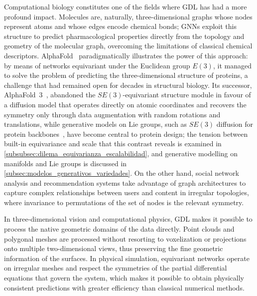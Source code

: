 Computational biology constitutes one of the fields where \gls{GDL} has had a more profound impact. Molecules are, naturally, three-dimensional graphs whose nodes represent atoms and whose edges encode chemical bonds; \glspl{GNN} exploit this structure to predict pharmacological properties directly from the topology and geometry of the molecular graph, overcoming the limitations of classical chemical descriptors. AlphaFold~\citep{jumper2021alphafold} paradigmatically illustrates the power of this approach: by means of networks equivariant under the Euclidean group $E(3)$, it managed to solve the problem of predicting the three-dimensional structure of proteins, a challenge that had remained open for decades in structural biology. Its successor, AlphaFold~3~\citep{abramson2024alphafold3}, abandoned the $SE(3)$-equivariant structure module in favour of a diffusion model that operates directly on atomic coordinates and recovers the symmetry only through data augmentation with random rotations and translations, while generative models on Lie groups, such as $SE(3)$ diffusion for protein backbones~\citep{yim2023se3diffusion}, have become central to protein design; the tension between built-in equivariance and scale that this contrast reveals is examined in \autoref{subsubsec:dilema_equivarianza_escalabilidad}, and generative modelling on manifolds and Lie groups is discussed in \autoref{subsec:modelos_generativos_variedades}. On the other hand, social network analysis and recommendation systems take advantage of graph architectures to capture complex relationships between users and content in irregular topologies, where invariance to permutations of the set of nodes is the relevant symmetry.

In three-dimensional vision and computational physics, \gls{GDL} makes it possible to process the native geometric domains of the data directly. Point clouds and polygonal meshes are processed without resorting to voxelization or projections onto multiple two-dimensional views, thus preserving the fine geometric information of the surfaces. In physical simulation, equivariant networks operate on irregular meshes and respect the symmetries of the partial differential equations that govern the system, which makes it possible to obtain physically consistent predictions with greater efficiency than classical numerical methods.


